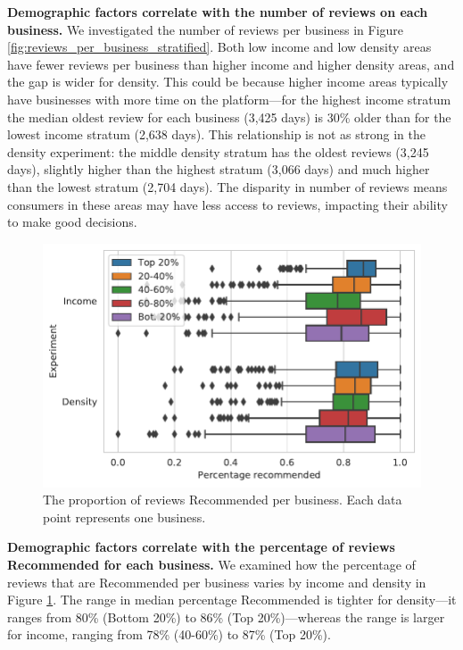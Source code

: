 \textbf{Demographic factors correlate with the number of reviews on each business.} We investigated the number of reviews per business in Figure \ref{fig:reviews_per_business_stratified}. Both low income and low density areas have fewer reviews per business than higher income and higher density areas, and the gap is wider for density. This could be because higher income areas typically have businesses with more time on the platform---for the highest income stratum the median oldest review for each business (3,425 days) is 30\% older than for the lowest income stratum (2,638 days). This relationship is not as strong in the density experiment: the middle density stratum has the oldest reviews (3,245 days), slightly higher than the highest stratum (3,066 days) and much higher than the lowest stratum (2,704 days). The disparity in number of reviews means consumers in these areas may have less access to reviews, impacting their ability to make good decisions.

 \begin{figure}[t]
     \centering
     \includegraphics[width=0.9\columnwidth]{chapters/reviews/figures/percentage_recommended_per_businesses_extended.pdf}
     \caption{The proportion of reviews Recommended per business. Each data point represents one business.}
     \label{fig:percentage_recommended_per_businesses_extended}
 \end{figure}
 
\textbf{Demographic factors correlate with the percentage of reviews Recommended for each business.} We examined how the percentage of reviews that are Recommended per business varies by income and density in Figure \ref{fig:percentage_recommended_per_businesses_extended}. The range in median percentage Recommended is tighter for density---it ranges from 80\% (Bottom 20\%) to 86\% (Top 20\%)---whereas the range is larger for income, ranging from 78\% (40-60\%) to 87\% (Top 20\%). 

